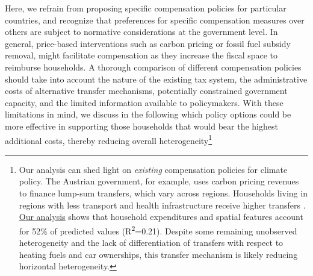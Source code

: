 \documentclass[12pt, a4paper]{article}
\begin{document}
Here, we refrain from proposing specific compensation policies for particular countries, and recognize that preferences for specific compensation measures over others are subject to normative considerations at the government level. In general, price-based interventions such as carbon pricing or fossil fuel subsidy removal, might facilitate compensation as they increase the fiscal space to reimburse households. A thorough comparison of different compensation policies should take into account the nature of the existing tax system, the administrative costs of alternative transfer mechanisms, potentially constrained government capacity, and the limited information available to policymakers. With these limitations in mind, we discuss in the following which policy options could be more effective in supporting those households that would bear the highest additional costs, thereby reducing overall heterogeneity\footnote{Our analysis can shed light on \textit{existing} compensation policies for climate policy. The Austrian government, for example, uses carbon pricing revenues to finance lump-sum transfers, which vary across regions. Households living in regions with less transport and health infrastructure receive higher transfers \autocite{BMK.2023}. \hyperref[fig:5b_AUT]{Our analysis} shows that household expenditures and spatial features account for 52\% of predicted values (R\textsuperscript{2}=0.21). Despite some remaining unobserved heterogeneity and the lack of differentiation of transfers with respect to heating fuels and car ownerships, this transfer mechanism is likely reducing horizontal heterogeneity.}

\end{document}
